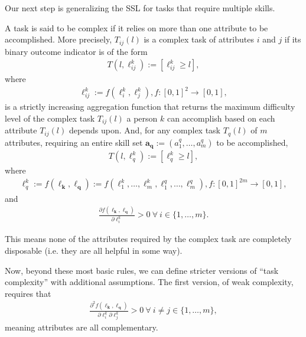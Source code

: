 \documentclass[hidelinks, nonatbib]{elsarticle}
\begin{document}
Our next step is generalizing the SSL for tasks that require multiple skills.
\begin{definition}
    \label{complex_task}
    A task is said to be complex if it relies on more than one attribute to be accomplished. More precisely, $T_{ij}(l)$ is a complex task of attributes $i$ and $j$ if its binary outcome indicator is of the form
    \begin{gather}
        T(l, \ell_{ij}^{k})
        :=
        [\ell_{ij}^{k} \geq l],
    \end{gather}
    where
    \begin{gather}
        \ell_{ij}^{k}
        :=
        f(\ell_{i}^{k}, \ell_{j}^{k})
        ,
        f
        :
        [0,1]^2
        \rightarrow
        [0,1]
        ,
    \end{gather}
    is a strictly increasing aggregation function that returns the maximum difficulty level of the complex task $T_{ij}(l)$ a person $k$ can accomplish based on each attribute $T_{ij}(l)$ depends upon. And, for any complex task $T_{q}(l)$ of $m$ attributes, requiring an entire skill set $\boldsymbol{a_q} := (a_{1}^{q}, \dots, a_{m}^{q})$ to be accomplished, 
    \begin{gather}
        T(l, \ell_{q}^{k})
        :=
        [\ell_{q}^{k} \geq l],
    \end{gather}
    where
    \begin{gather}
        \ell_{q}^{k}
        := 
        f(\boldsymbol{\ell_k}, \boldsymbol{\ell_q})
        :=
        f(\ell_{1}^{k}, \dots, \ell_{m}^{k}, \ell_{1}^{q}, \dots, \ell_{m}^{q})
        ,
        f
        :
        [0,1]^{2m}
        \rightarrow
        [0,1]
        ,
    \end{gather}
    and 
    \begin{gather}
        \frac{
            \partial
            f(\boldsymbol{\ell_k}, \boldsymbol{\ell_q})
        }{
            \partial 
            \ell_{i}^{k}
        } > 0
        \
        \forall 
        \
        i \in \{1, \dots, m\}
        .
    \end{gather}
        
    This means none of the attributes required by the complex task are completely disposable (i.e. they are all helpful in some way).
    
    \begin{subdefinition}
        Now, beyond these most basic rules, we can define stricter versions of ``task complexity'' with additional assumptions. The first version, of weak complexity, requires that
        \begin{gather}
            \frac{
                \partial ^ 2 {
                    f(\boldsymbol{\ell_k}, \boldsymbol{\ell_q})
                }
            }{
                \partial 
                \ell_{i}^{k}
                \partial
                \ell_{j}^{k}
            }
            > 0
            \
            \forall
            \
            i \neq j \in \{1, \dots, m\}
            ,
        \end{gather}
        meaning attributes are all complementary.
    \end{subdefinition}
    

\end{definition}
\end{document}
